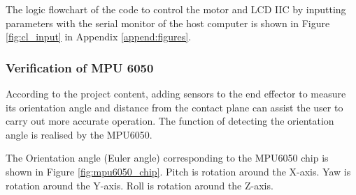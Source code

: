 The logic flowchart of the code to control the motor and LCD IIC by inputting parameters with the serial monitor of 
the host computer is shown in Figure \ref{fig:cl_input} in Appendix \ref{append:figures}.
\subsubsection{Verification of MPU 6050}
According to the project content, adding sensors to the end effector to measure its orientation angle and distance 
from the contact plane can assist the user to carry out more accurate operation. The function of detecting the 
orientation angle is realised by the MPU6050.

The Orientation angle (Euler angle) corresponding to the MPU6050 chip is shown in Figure \ref{fig:mpu6050_chip}. 
Pitch is rotation around the X-axis. Yaw is rotation around the Y-axis. Roll is rotation around the Z-axis. 
